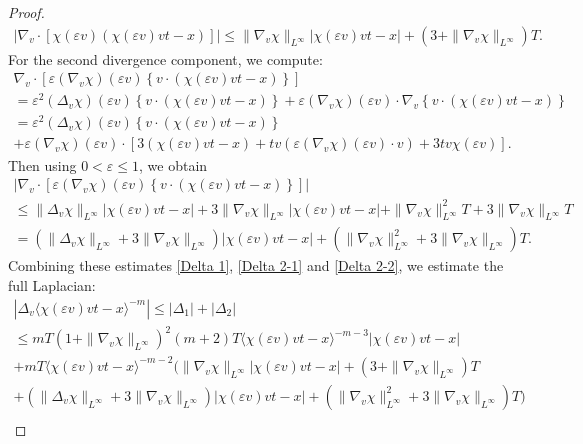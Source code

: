 \documentclass[10pt,a4paper]{amsart}
\begin{document}
\begin{proof}
\begin{align}
|\nabla_v\cdot[\chi(\varepsilon v)(\chi(\varepsilon v)vt - x)]| \le \|\nabla_v\chi\|_{L^\infty}|\chi(\varepsilon v)vt - x| + (3+\|\nabla_v\chi\|_{L^\infty})T.
\end{align}For the second divergence component, we compute:
\begin{multline*}
\nabla_v\cdot \left[\varepsilon (\nabla_v\chi)(\varepsilon v)\left\{v\cdot(\chi(\varepsilon v)vt - x)\right\}\right]\\
=\varepsilon^2(\Delta_v\chi)(\varepsilon v)\left\{v\cdot(\chi(\varepsilon v)vt - x)\right\} + \varepsilon (\nabla_v\chi)(\varepsilon v)\cdot\nabla_v\left\{v\cdot(\chi(\varepsilon v)vt - x) \right\}\\
=\varepsilon^2(\Delta_v\chi)(\varepsilon v)\left\{v\cdot(\chi(\varepsilon v)vt - x)\right\} 
\\
+ \varepsilon(\nabla_v\chi)(\varepsilon v)\cdot\left[3(\chi(\varepsilon v)vt - x) + tv(\varepsilon(\nabla_v\chi)(\varepsilon v)\cdot v) + 3tv\chi(\varepsilon v)\right].
\end{multline*}Then using $0<\varepsilon\le 1$, we obtain
\begin{multline}
    |\nabla_v\cdot \left[\varepsilon (\nabla_v\chi)(\varepsilon v)\left\{v\cdot(\chi(\varepsilon v)vt - x)\right\}\right]| \\
    \le\|\Delta_v\chi\|_{L^\infty}|\chi(\varepsilon v)vt - x| + 3\|\nabla_v\chi\|_{L^\infty}|\chi(\varepsilon v) vt - x| + \|\nabla_v\chi\|_{L^\infty}^2T + 3\|\nabla_v\chi\|_{L^\infty}T\\
= (\|\Delta_v\chi\|_{L^\infty}+ 3\|\nabla_v\chi\|_{L^\infty})|\chi(\varepsilon v) vt-x| + (\|\nabla_v\chi\|_{L^\infty}^2 + 3\|\nabla_v\chi\|_{L^\infty})T.\label{Delta 2-2}
\end{multline}Combining these estimates \eqref{Delta 1}, \eqref{Delta 2-1} and \eqref{Delta 2-2}, we estimate the full Laplacian:
\begin{multline}
|\Delta_v\langle \chi(\varepsilon v) vt - x\rangle^{-m}|\le |\Delta_1| + |\Delta_2| \\
\le mT  (1+\|\nabla_v\chi\|_{L^\infty})^2(m+2)T\langle \chi(\varepsilon v)vt - x\rangle^{-m-3} |\chi(\varepsilon v)vt - x|\\
+ mT \langle \chi(\varepsilon v)vt - x\rangle^{-m-2} (\|\nabla_v\chi\|_{L^\infty}|\chi(\varepsilon v)vt - x| + (3+\|\nabla_v\chi\|_{L^\infty})T \\+ (\|\Delta_v\chi\|_{L^\infty}+ 3\|\nabla_v\chi\|_{L^\infty})|\chi(\varepsilon v)vt - x| + (\|\nabla_v\chi\|_{L^\infty}^2 + 3\|\nabla_v\chi\|_{L^\infty})T)\\

\end{multline}
\end{proof}
\end{document}
